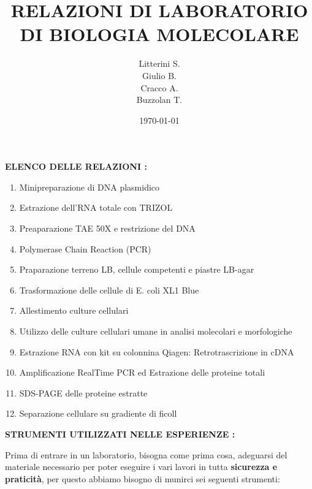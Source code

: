\documentclass{article}
\begin{document}
	\title{RELAZIONI DI LABORATORIO DI BIOLOGIA MOLECOLARE}

	\author{Litterini S. \\Giulio B. \\Cracco A.\\Buzzolan T. }

	\date{\today}

	\maketitle

	\vspace{1.5cm}

	\large{\textbf{ELENCO DELLE RELAZIONI :}}
	\vspace{0.5cm}

	\begin{enumerate}

		\item Minipreparazione di DNA plasmidico
		\item Estrazione dell'RNA totale con TRIZOL
		\item Preaparazione TAE 50X e restrizione del DNA
		\item Polymerase Chain Reaction (PCR)
		\item Praparazione terreno LB, cellule competenti e piastre LB-agar
		\item Trasformazione delle cellule di E. coli XL1 Blue
		\item Allestimento culture cellulari
		\item Utilizzo delle culture cellulari umane in analisi molecolari e morfologiche
		\item Estrazione RNA con kit su colonnina Qiagen: Retrotrascrizione in cDNA
		\item Amplificazione RealTime PCR ed Estrazione delle proteine totali
		\item SDS-PAGE delle proteine estratte
		\item Separazione cellulare su gradiente di ficoll

	\end{enumerate}

	\newpage


	\large{\textbf{STRUMENTI UTILIZZATI NELLE ESPERIENZE :}}

		\vspace{0.5cm}

		Prima di entrare in un laboratorio, bisogna come prima cosa, adeguarsi del materiale necessario
		per poter eseguire i vari lavori in tutta \textbf{sicurezza e praticità}, per questo abbiamo bisogno di munirci
		sei seguenti strumenti:
\end{document}
